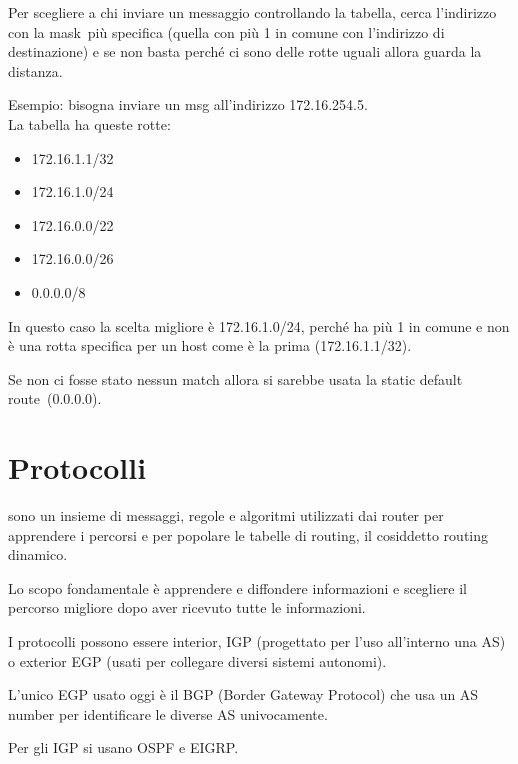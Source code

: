 \documentclass[
]{article}
\providecommand{\tightlist}{%
  \setlength{\itemsep}{0pt}\setlength{\parskip}{0pt}}
\begin{document}
{Per scegliere a chi inviare un messaggio controllando la tabella, cerca
l'indirizzo con la }{mask}{~più specifica (quella con più 1 in comune
con l'indirizzo di destinazione) e se non basta perché ci sono delle
rotte uguali allora guarda la distanza.}

{}

{Esempio}{: bisogna inviare un msg all'indirizzo }{172.16.254.5}{.\\
La tabella ha queste rotte:}

\begin{itemize}
\tightlist
\item
  {172.16.1.1/32 }
\item
  {172.16.1.0/24 }
\item
  {172.16.0.0/22 }
\item
  {172.16.0.0/26 }
\item
  {0.0.0.0/8}
\end{itemize}

{In questo caso la scelta migliore è }{172.16.1.0/24}{, perché ha più 1
in comune e non è una rotta specifica per un host come è la prima
(172.16.1.1/32).}

{}

{Se non ci fosse stato nessun match allora si sarebbe usata la }{static
default route}{~(0.0.0.0).}

{}

\section{\texorpdfstring{{Protocolli}}{Protocolli}}\label{h.jqza611qo8sb}

{sono un insieme di messaggi, regole e algoritmi utilizzati dai router
per apprendere i percorsi e per popolare le tabelle di routing, il
cosiddetto routing dinamico.}

{}

{Lo scopo fondamentale è apprendere e diffondere informazioni e
scegliere il percorso migliore dopo aver ricevuto tutte le
informazioni.}

{}

{I protocolli possono essere interior, IGP (progettato per l'uso
all'interno una AS) o exterior EGP (usati per collegare diversi sistemi
autonomi).}

{L'unico EGP usato oggi è il BGP (Border Gateway Protocol) che usa un AS
number per identificare le diverse AS univocamente.}

{Per gli IGP si usano OSPF e EIGRP.}
\end{document}
